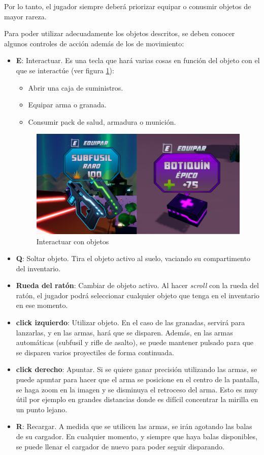 Por lo tanto, el jugador siempre deberá priorizar equipar o conusmir objetos de mayor rareza.

Para poder utilizar adecuadamente los objetos descritos, se deben conocer algunos controles de acción además de los de movimiento:
\begin{itemize}
    \item \textbf{E}: Interactuar. Es una tecla que hará varias cosas en función del objeto con el que se interactúe (ver figura \ref{fig:Interactuar}):
    \begin{itemize}
        \item Abrir una caja de suministros.
        \item Equipar arma o granada.
        \item Consumir pack de salud, armadura o munición.
        \end{itemize}
        
        \begin{figure}[h]
    \centering
    \includegraphics[scale=0.45]{img/LabelExamples.png}
    \caption{Interactuar con objetos}
    \label{fig:Interactuar}
    \end{figure}
    
    \item \textbf{Q}: Soltar objeto. Tira el objeto activo al suelo, vaciando su compartimento del inventario.
    \item \textbf{Rueda del ratón}: Cambiar de objeto activo. Al hacer \textit{scroll} con la rueda del ratón, el jugador podrá seleccionar cualquier objeto que tenga en el inventario en ese momento.
    \item \textbf{click izquierdo}: Utilizar objeto. En el caso de las granadas, servirá para lanzarlas, y en las armas, hará que se disparen. Además, en las armas automáticas (subfusil y rifle de asalto), se puede mantener pulsado para que se disparen varios proyectiles de forma continuada.
    \item \textbf{click derecho}: Apuntar. Si se quiere ganar precisión utilizando las armas, se puede apuntar para hacer que el arma se posicione en el centro de la pantalla, se haga zoom en la imagen y se disminuya el retroceso del arma. Esto es muy útil por ejemplo en grandes distancias donde es difícil concentrar la mirilla en un punto lejano.
    \item \textbf{R}: Recargar. A medida que se utilicen las armas, se irán agotando las balas de su cargador. En cualquier momento, y siempre que haya balas disponibles, se puede llenar el cargador de nuevo para poder seguir disparando.
\end{itemize}
